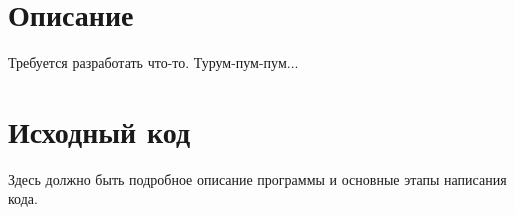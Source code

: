 \section{Описание}
Требуется разработать что-то. Турум-пум-пум...

\pagebreak

\section{Исходный код}
Здесь должно быть подробное описание программы и основные этапы написания кода.

\pagebreak

